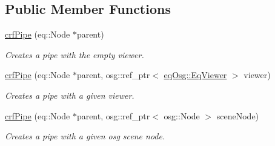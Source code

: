 \subsection*{Public Member Functions}
\begin{CompactItemize}
\item 
\hyperlink{a00006_0b43238e38fb190f8a5e9a6148950ea0}{crfPipe} (eq::Node $\ast$parent)
\begin{CompactList}\small\item\em Creates a pipe with the empty viewer. \item\end{CompactList}\item 
\hyperlink{a00006_f5c46c7219b170979654b9e0defda4a7}{crfPipe} (eq::Node $\ast$parent, osg::ref\_\-ptr$<$ \hyperlink{a00009}{eqOsg::EqViewer} $>$ viewer)
\begin{CompactList}\small\item\em Creates a pipe with a given viewer. \item\end{CompactList}\item 
\hyperlink{a00006_d1215b24804515699867f0e718eb6985}{crfPipe} (eq::Node $\ast$parent, osg::ref\_\-ptr$<$ osg::Node $>$ sceneNode)
\begin{CompactList}\small\item\em Creates a pipe with a given osg scene node. \item\end{CompactList}\end{CompactItemize}
